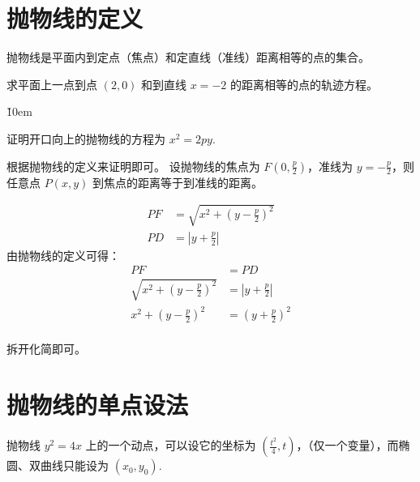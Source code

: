 \section{抛物线的定义}

\begin{definition}
    抛物线是平面内到定点（焦点）和定直线（准线）距离相等的点的集合。
\end{definition}

\begin{example}
    求平面上一点到点 $(2,0)$ 和到直线 $x=-2$ 的距离相等的点的轨迹方程。
\end{example}

\v{10em}

\begin{example}
    证明开口向上的抛物线的方程为 $x^2 = 2py$.
\end{example}

\begin{solution}
    根据抛物线的定义来证明即可。
    设抛物线的焦点为 $F(0,\frac{p}{2})$，准线为 $y = -\frac{p}{2}$，则任意点 $P(x,y)$ 到焦点的距离等于到准线的距离。

    \begin{align*}
        PF & = \sqrt{x^2 + (y-\frac{p}{2})^2} \\
        PD & = |y + \frac{p}{2}|
    \end{align*}
    由抛物线的定义可得：
    \begin{align*}
        PF                             & = PD                \\
        \sqrt{x^2 + (y-\frac{p}{2})^2} & = |y + \frac{p}{2}| \\
        x^2 + (y-\frac{p}{2})^2        & = (y+\frac{p}{2})^2 \\
    \end{align*}

    拆开化简即可。
\end{solution}

\vspace{1em}

\section{抛物线的单点设法}

\begin{theorem}
    抛物线 $y^2=4x$ 上的一个动点，可以设它的坐标为 $(\frac{t^2}{4},t)$，（仅一个变量），而椭圆、双曲线只能设为 $(x_0,y_0)$.
\end{theorem}

